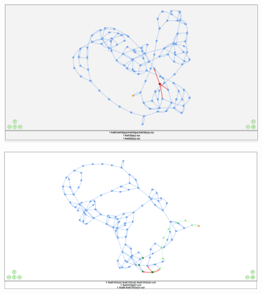 \documentclass[10pt]{beamer}
\begin{document}

\begin{frame}[standout]
\thispagestyle{empty}
\begin{center}
\includegraphics[width=1\textwidth]{BCSgen_ss}
\end{center}
\end{frame}


\begin{frame}[standout]
\thispagestyle{empty}
\begin{center}
\includegraphics[width=1\textwidth]{BCSgen_reach}
\end{center}
\end{frame}

\end{document}
